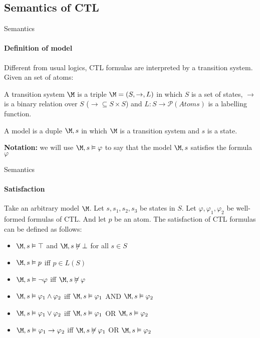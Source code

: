 \subsection{Semantics of CTL}
\begin{frame}{Semantics}
	\framesubtitle{Definition of model}
	Different from usual logics, CTL formulas are interpreted by a transition system. Given an set of atoms:\pause
	\begin{definition}[1]
		A transition system $\M$ is a triple $\M = (S, \to, L)$ in which $S$ is a set of states, $\to$ is a binary relation over $S$ ($\to \subseteq S\times S$) and $L: S \to \mathcal{P}(Atoms)$ is a labelling function.
	\end{definition}\pause
	\begin{definition}[2]
		A model is a duple $\M,s$ in which $\M$ is a transition system and $s$ is a state.
	\end{definition}\pause
	
	{\bf Notation:} we will use $\M,s\vDash \varphi$ to say that the model $\M,s$ satisfies the formula $\varphi$
\end{frame}


\begin{frame}{Semantics}
	\framesubtitle{Satisfaction}
	Take an arbitrary model $\M$. Let $s, s_1, s_2, s_3$ be states in $S$. Let $\varphi, \varphi_1, \varphi_2$ be well-formed formulas of CTL. And let $p$ be an atom. The satisfaction of CTL formulas can be defined as follows:
	\begin{itemize}
		\item $\M,s \vDash \top$ and $\M,s \not\vDash \bot$ for all $s \in S$ \pause
		\item $\M,s \vDash p$ iff $p \in L(S)$ \pause
		\item $\M,s \vDash \neg\varphi$ iff $\M,s \not\vDash \varphi$ \pause
		\item $\M,s \vDash \varphi_1 \land \varphi_2$ iff $\M,s \vDash \varphi_1$ AND $\M,s \vDash \varphi_2$ \pause
		\item $\M,s \vDash \varphi_1 \lor \varphi_2$ iff $\M,s \vDash \varphi_1$ OR $\M,s \vDash \varphi_2$ \pause
		\item $\M,s \vDash \varphi_1 \to \varphi_2$ iff $\M,s \not\vDash \varphi_1$ OR $\M,s \vDash \varphi_2$
	\end{itemize}
\end{frame}

